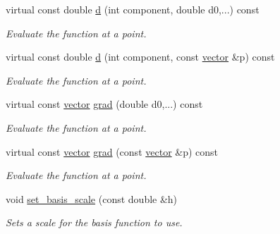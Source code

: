 \begin{DoxyCompactItemize}
virtual const double \hyperlink{classsisl_1_1si__function_acb42bd4f8b06bc38708ae2ccf8ad6b93}{d} (int component, double d0,...) const
\begin{DoxyCompactList}\small\item\em Evaluate the function at a point. \end{DoxyCompactList}\item 
\mbox{\label{classsisl_1_1si__function_a43b958c96c151d6516e956b7187fe941}} 
virtual const double \hyperlink{classsisl_1_1si__function_a43b958c96c151d6516e956b7187fe941}{d} (int component, const \hyperlink{namespacesisl_a2069bd5374a9be042ff3ce3306d41e1a}{vector} \&p) const
\begin{DoxyCompactList}\small\item\em Evaluate the function at a point. \end{DoxyCompactList}\item 
\mbox{\label{classsisl_1_1si__function_a76031a5cf6384b8dc587ad452ed352f5}} 
virtual const \hyperlink{namespacesisl_a2069bd5374a9be042ff3ce3306d41e1a}{vector} \hyperlink{classsisl_1_1si__function_a76031a5cf6384b8dc587ad452ed352f5}{grad} (double d0,...) const
\begin{DoxyCompactList}\small\item\em Evaluate the function at a point. \end{DoxyCompactList}\item 
\mbox{\label{classsisl_1_1si__function_a30f4ba2d0bdeae4c3f5738a3f4d431e4}} 
virtual const \hyperlink{namespacesisl_a2069bd5374a9be042ff3ce3306d41e1a}{vector} \hyperlink{classsisl_1_1si__function_a30f4ba2d0bdeae4c3f5738a3f4d431e4}{grad} (const \hyperlink{namespacesisl_a2069bd5374a9be042ff3ce3306d41e1a}{vector} \&p) const
\begin{DoxyCompactList}\small\item\em Evaluate the function at a point. \end{DoxyCompactList}\item 
\mbox{\label{classsisl_1_1si__function_a31d60f7c94fc37620cf543842e3ea65b}} 
void \hyperlink{classsisl_1_1si__function_a31d60f7c94fc37620cf543842e3ea65b}{set\+\_\+basis\+\_\+scale} (const double \&h)
\begin{DoxyCompactList}\small\item\em Sets a scale for the basis function to use. \end{DoxyCompactList}\item 

\end{DoxyCompactItemize}
